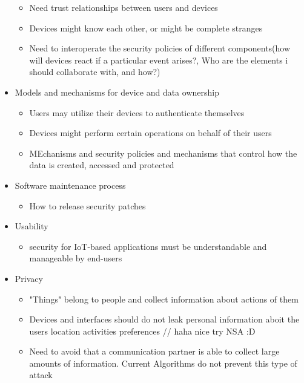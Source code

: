 \documentclass[a4paper, 12pt]{article}
\begin{document}
\begin{itemize}
\begin{itemize}
\item Need trust relationships between users and devices
\item Devices might know each other, or might be complete stranges
\item Need to interoperate the security policies of different components(how will devices react if a particular event arises?, Who are the elements i should collaborate with, and how?)
\end{itemize}
\item Models and mechanisms for device and data ownership
\begin{itemize}
\item Users may utilize their devices to authenticate themselves
\item Devices might perform certain operations on behalf of their users
\item MEchanisms and security policies and mechanisms that control how the data is created, accessed and protected
\end{itemize}
\item Software maintenance process
\begin{itemize}
\item How to release security patches
\end{itemize}
\item Usability
\begin{itemize}
\item security for IoT-based applications must be understandable and manageable by end-users
\end{itemize}
\item Privacy
\begin{itemize}
\item "Things" belong to people and collect information about actions of them
\item Devices and interfaces should do not leak personal information aboit the users location activities preferences // haha nice try NSA :D
\item Need to avoid that a communication partner is able to collect large amounts of information. Current Algorithms do not prevent this type of attack
\end{itemize}
\end{itemize}
\end{document}
